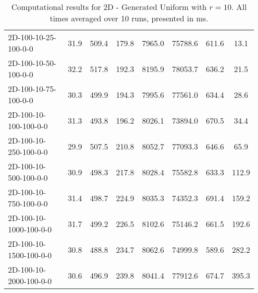 \documentclass{article}
\begin{document}
\begin{table}[h]
\begin{center}
\begin{tabular}{|l||c|c|c|c|c|c|c|}
            \hline
            2D-100-10-25-100-0-0           & 31.9 & 509.4     & 179.8      & 7965.0      & 75788.6  & 611.6     & 13.1       \\
            2D-100-10-50-100-0-0           & 32.2 & 517.8     & 192.3      & 8195.9      & 78053.7  & 636.2     & 21.5       \\
            2D-100-10-75-100-0-0           & 30.3 & 499.9     & 194.3      & 7995.6      & 77561.0  & 634.4     & 28.6       \\
            2D-100-10-100-100-0-0          & 31.3 & 493.8     & 196.2      & 8026.1      & 73894.0  & 670.5     & 34.4       \\
            2D-100-10-250-100-0-0          & 29.9 & 507.5     & 210.8      & 8052.7      & 77093.3  & 646.6     & 65.9       \\
            2D-100-10-500-100-0-0          & 30.9 & 498.3     & 217.8      & 8028.4      & 75582.8  & 633.3     & 112.9      \\
            2D-100-10-750-100-0-0          & 31.4 & 498.7     & 224.9      & 8035.3      & 74352.3  & 691.4     & 159.2      \\
            2D-100-10-1000-100-0-0         & 31.7 & 499.2     & 226.5      & 8102.6      & 75146.2  & 661.5     & 192.6      \\
            2D-100-10-1500-100-0-0         & 30.8 & 488.8     & 234.7      & 8062.6      & 74999.8  & 589.6     & 282.2      \\
            2D-100-10-2000-100-0-0         & 30.6 & 496.9     & 239.8      & 8041.4      & 77912.6  & 674.7     & 395.3      \\
            \hline
        \end{tabular}
        \caption{Computational results for 2D - Generated Uniform with $r=10$. All times averaged over 10 runs, presented in ms.}
    \end{center}
    \end{table}
\end{document}

